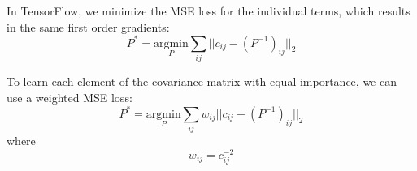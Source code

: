 \documentclass[11pt]{article}
\begin{document}
In TensorFlow, we minimize the MSE loss for the individual terms, which results in the same first order gradients:
\begin{equation}
P^* = \underset{P}{\text{argmin}} \sum_{ij} \Big | \Big | c_{ij} - (P^{-1})_{ij} \Big | \Big |_2
\end{equation}

To learn each element of the covariance matrix with equal importance, we can use a weighted MSE loss:
\begin{equation}
P^* = \underset{P}{\text{argmin}} \sum_{ij} w_{ij} \Big | \Big | c_{ij} - (P^{-1})_{ij} \Big | \Big |_2
\end{equation}
where
\begin{equation}
w_{ij} = c_{ij}^{-2}
\end{equation}
\end{document}
